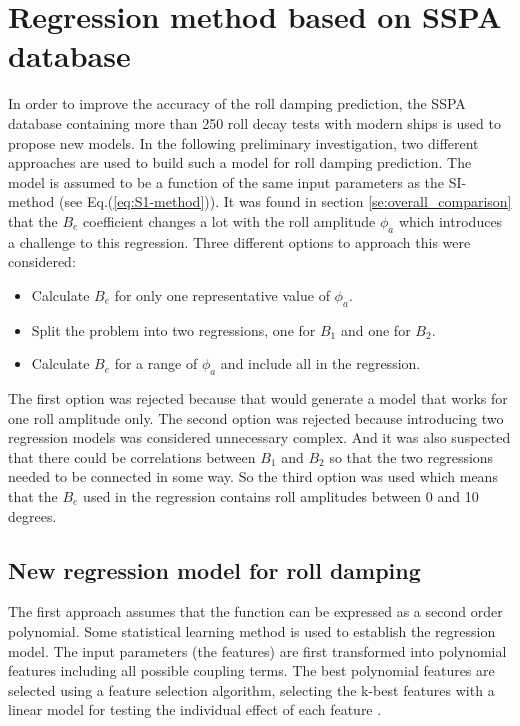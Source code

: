\section{Regression method based on SSPA database}
\label{se:correction_SI_method}
In order to improve the accuracy of the roll damping prediction, the SSPA database containing more than 250 roll decay tests with modern ships is used to propose new models. In the following preliminary investigation, two different approaches are used to build such a model for roll damping prediction. The model is assumed to be a function of the same input parameters as the SI-method (see Eq.(\ref{eq:S1-method})). It was found in section \ref{se:overall_comparison} that the $B_e$ coefficient changes a lot with the roll amplitude $\phi_a$ which introduces a challenge to this regression. Three different options to approach this were considered:
\begin{itemize}
    \item Calculate $B_e$ for only one representative value of $\phi_a$.
    \item Split the problem into two regressions, one for $B_1$ and one for $B_2$.
    \item Calculate $B_e$ for a range of $\phi_a$ and include all in the regression.
\end{itemize}
The first option was rejected because that would generate a model that works for one roll amplitude only. The second option was rejected because introducing two regression models was considered unnecessary complex. And it was also suspected that there could be correlations between $B_1$ and $B_2$ so that the two regressions needed to be connected in some way. So the third option was used which means that the $B_e$ used in the regression contains roll amplitudes between 0 and 10 degrees.  

\subsection{New regression model for roll damping}
The first approach assumes that the function can be expressed as a second order polynomial. Some statistical learning method is used to establish the regression model. The input parameters (the features) are first transformed into polynomial features including all possible coupling terms. The best polynomial features are selected using a feature selection algorithm, selecting the k-best features \parencite[]{noauthor_sklearnfeature_selectionselectkbest_nodate} with a linear model for testing the individual effect of each feature \parencite[]{noauthor_sklearnfeature_selectionf_regression_nodate}. 

